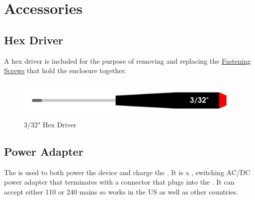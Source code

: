 \chapter{Accessories} \label{Accessories}

\section{Hex Driver} \label{Hex Driver}

A  hex driver is included for the purpose of removing and replacing
the \hyperref[Fastening Screws]{Fastening Screws} that hold the enclosure
together.

\begin{figure}[H]
\centering
  \includegraphics{images/hex_driver.png}
\caption{3/32" Hex Driver}
\end{figure}


\section{Power Adapter} \label{Power Adapter}

The  is used to both power the device
and charge the \hyperref[Rechargeable Battery]{}.  It is a
,  switching AC/DC power adapter
that terminates with a  connector that plugs into the
\hyperref[USB Port]{}.  It can accept either \num{110} or \num{240}
 mains so works in the US as well as other countries.

\par\medskip

